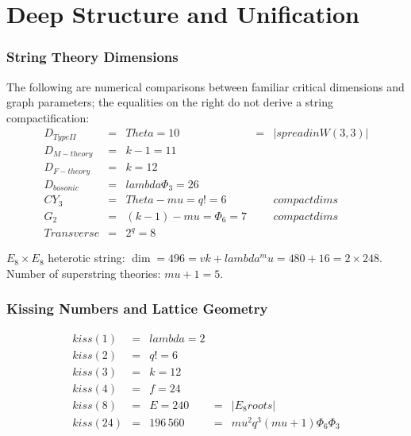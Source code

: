 \documentclass[12pt,a4paper]{article}
\def\mathrm#1{#1}%
\def\text#1{#1}%
\def\lambda{lambda}%
\def\mu{mu}%
\def\Phi#1{Phi#1}%
\def\Theta{Theta}%
\theoremstyle{definition}
\newcommand{\Phithree}{\Phi_3}
\newcommand{\Phisix}{\Phi_6}
\begin{document}
\newpage
\part{Deep Structure and Unification}

\section{String Theory Dimensions}
\label{sec:string}

The following are numerical comparisons between familiar critical
dimensions and graph parameters; the equalities on the right do not
derive a string compactification:
\begin{equation}
\renewcommand{\arraystretch}{1.3}
\begin{array}{rclcl}
D_{\text{Type II}} &=& \Theta = 10 &=& |\text{spread in }W(3,3)| \\
D_{\text{M-theory}} &=& k-1 = 11 && \\
D_{\text{F-theory}} &=& k = 12 && \\
D_{\text{bosonic}} &=& \lambda\Phithree = 26 && \\
\text{CY}_3 &=& \Theta-\mu = q! = 6 &&\text{compact dims} \\
G_2 &=& (k-1)-\mu = \Phisix = 7 &&\text{compact dims} \\
\text{Transverse} &=& 2^q = 8 &&
\end{array}
\end{equation}

$E_8\times E_8$ heterotic string:
$\dim = 496 = vk+\lambda^\mu = 480+16 = 2\times 248$.
Number of superstring theories: $\mu+1 = 5$.


\section{Kissing Numbers and Lattice Geometry}
\label{sec:kissing}

\begin{equation}
\renewcommand{\arraystretch}{1.3}
\begin{array}{rclcl}
\mathrm{kiss}(1) &=& \lambda = 2 && \\
\mathrm{kiss}(2) &=& q! = 6 && \\
\mathrm{kiss}(3) &=& k = 12 && \\
\mathrm{kiss}(4) &=& f = 24 && \\
\mathrm{kiss}(8) &=& E = 240 &=& |E_8\text{ roots}| \\
\mathrm{kiss}(24) &=& 196\,560 &=& \mu^2q^3(\mu+1)\Phisix\Phithree
\end{array}
\end{equation}
\end{document}
